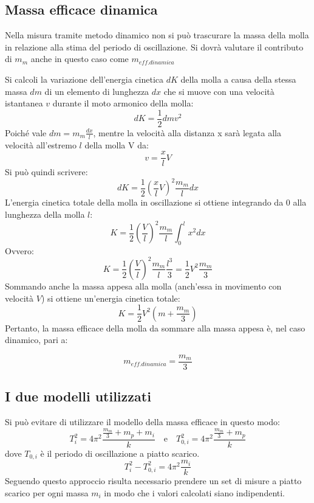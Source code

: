 \documentclass[a4paper,12pt]{article}
\begin{document}
\subsection{Massa efficace dinamica}
Nella misura tramite metodo dinamico non si può trascurare la massa della molla in relazione alla stima del
periodo di oscillazione.
Si dovrà valutare il contributo di $m_m$ anche in questo caso come $m_{eff.dinamica}$

Si calcoli la variazione dell'energia cinetica $dK$ della molla a causa della stessa massa $dm$ di un 
elemento di lunghezza $dx$ che si muove con una velocità istantanea $v$ durante il moto armonico della molla:
$$
dK = \frac{1}{2}dmv^2
$$
Poiché vale $dm = m_m \frac{dx}{l}$, mentre la velocità alla distanza x sarà legata alla velocità all'estremo
$l$ della molla V da:
$$
v = \frac{x}{l}V
$$
Si può quindi scrivere:
$$
dK = \frac{1}{2}(\frac{x}{l}V)^2 \frac{m_m}{l}dx
$$
L'energia cinetica totale della molla in oscillazione si ottiene integrando da 0 alla lunghezza della molla $l$:
$$
K = \frac{1}{2}(\frac{V}{l})^2 \frac{m_m}{l} \int_{0}^{l} x^2 dx
$$
Ovvero:
$$
K = \frac{1}{2}(\frac{V}{l})^2 \frac{m_m}{l} \frac{l^3}{3} = \frac{1}{2}V^2 \frac{m_m}{3}
$$
Sommando anche la massa appesa alla molla (anch'essa in movimento con velocità $V$) si ottiene un'energia
cinetica totale:
$$
K = \frac{1}{2}V^2 (m+\frac{m_m}{3})
$$
Pertanto, la massa efficace della molla da sommare alla massa appesa è, nel caso dinamico,
pari a:

$$
m_{eff.dinamica} = \frac{m_m}{3}
$$
\subsection{I due modelli utilizzati}
Si può evitare di utilizzare il modello della massa efficace in questo modo:
\begin{equation*}
    T_i^2 = 4\pi^2 \frac{\frac{m_m}{3} + m_p + m_i}{k} \quad \text{e} \quad T_{0,i}^2 = 4\pi^2 \frac{\frac{m_m}{3} + m_p}{k}
\end{equation*}
dove $T_{0,i}$ è il periodo di oscillazione a piatto scarico.
\begin{equation*}
    T_i^2 - T_{0,i}^2 = 4\pi^2 \frac{m_i}{k}
\end{equation*}
Seguendo questo approccio risulta necessario prendere un set di misure a piatto scarico per ogni massa $m_i$ in modo che i valori calcolati siano indipendenti.
\end{document}
